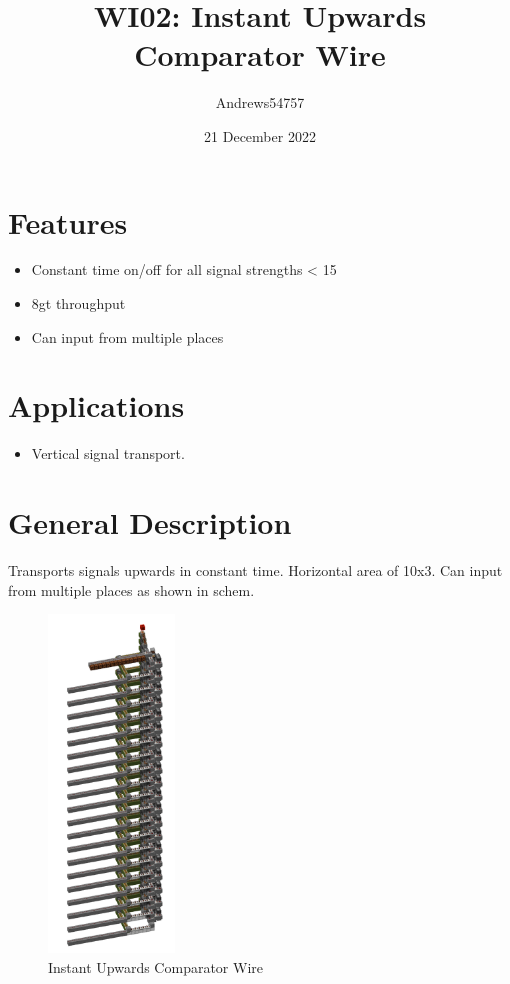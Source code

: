 \documentclass[10pt]{datasheet}
\title{WI02: Instant Upwards Comparator Wire}
\author{Andrews54757}
\date{21 December 2022}
\begin{document}
\maketitle

\section{Features}

\begin{itemize}
\item{Constant time on/off for all signal strengths < 15}
\item{8gt throughput}
\item{Can input from multiple places}
\end{itemize}

\section{Applications}

\begin{itemize}
\item{Vertical signal transport.}
\end{itemize}

\section{General Description}
Transports signals upwards in constant time. Horizontal area of 10x3. Can input from multiple places as shown in schem.

\vfill\break

\begin{figure}[h]
    \centering
    \includegraphics[width=0.30\textwidth]{area_render_3_copy.png}
    \caption{\centering Instant Upwards Comparator Wire}
\end{figure}
\end{document}
